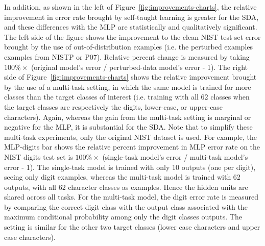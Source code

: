 \documentclass[smallcondensed]{svjour3}     %
\begin{document}
In addition, as shown in the left of
Figure~\ref{fig:improvements-charts}, the relative improvement in error
rate brought by self-taught learning is greater for the SDA, and these
differences with the MLP are statistically and qualitatively
significant. 
The left side of the figure shows the improvement to the clean
NIST test set error brought by the use of out-of-distribution examples
(i.e. the perturbed examples examples from NISTP or P07). 
Relative percent change is measured by taking
$100 \% \times$ (original model's error / perturbed-data model's error - 1).
The right side of
Figure~\ref{fig:improvements-charts} shows the relative improvement
brought by the use of a multi-task setting, in which the same model is
trained for more classes than the target classes of interest (i.e. training
with all 62 classes when the target classes are respectively the digits,
lower-case, or upper-case characters). Again, whereas the gain from the
multi-task setting is marginal or negative for the MLP, it is substantial
for the SDA.  Note that to simplify these multi-task experiments, only the original
NIST dataset is used. For example, the MLP-digits bar shows the relative
percent improvement in MLP error rate on the NIST digits test set 
is $100\% \times$ (single-task
model's error / multi-task model's error - 1).  The single-task model is
trained with only 10 outputs (one per digit), seeing only digit examples,
whereas the multi-task model is trained with 62 outputs, with all 62
character classes as examples.  Hence the hidden units are shared across
all tasks.  For the multi-task model, the digit error rate is measured by
comparing the correct digit class with the output class associated with the
maximum conditional probability among only the digit classes outputs.  The
setting is similar for the other two target classes (lower case characters
and upper case characters).

\end{document}
